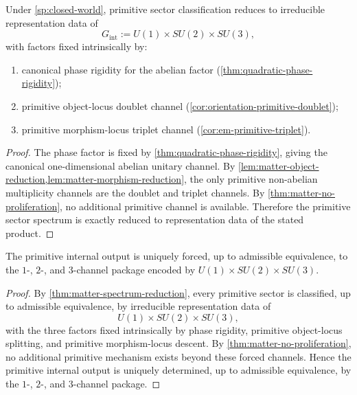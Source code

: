 \begin{theorem}
\label{thm:matter-spectrum-reduction}
Under \cref{sp:closed-world}, primitive sector classification reduces to
irreducible representation data of
\[
  G_{\mathrm{int}} := U(1)\times SU(2)\times SU(3),
\]
with factors fixed intrinsically by:
\begin{enumerate}[label=\textup{(\roman*)}]
\item canonical phase rigidity for the abelian factor
      (\cref{thm:quadratic-phase-rigidity});
\item primitive object-locus doublet channel
      (\cref{cor:orientation-primitive-doublet});
\item primitive morphism-locus triplet channel
      (\cref{cor:em-primitive-triplet}).
\end{enumerate}
\end{theorem}

\begin{proof}
The phase factor is fixed by
\cref{thm:quadratic-phase-rigidity}, giving the canonical
one-dimensional abelian unitary channel.
By
\cref{lem:matter-object-reduction,lem:matter-morphism-reduction}, the
only primitive non-abelian multiplicity channels are the doublet and
triplet channels.
By \cref{thm:matter-no-proliferation}, no additional primitive channel is
available.
Therefore the primitive sector spectrum is exactly reduced to
representation data of the stated product.
\end{proof}

\begin{corollary}
\label{cor:matter-unique-forced-output}
The primitive internal output is uniquely forced, up to admissible
equivalence, to the
\(1\)-, \(2\)-, and \(3\)-channel package encoded by
\(U(1)\times SU(2)\times SU(3)\).
\end{corollary}

\begin{proof}
By \cref{thm:matter-spectrum-reduction}, every primitive sector is
classified, up to admissible equivalence, by irreducible representation
data of
\[
  U(1)\times SU(2)\times SU(3),
\]
with the three factors fixed intrinsically by phase rigidity, primitive
object-locus splitting, and primitive morphism-locus descent.
By \cref{thm:matter-no-proliferation}, no additional primitive mechanism
exists beyond these forced channels.
Hence the primitive internal output is uniquely determined, up to
admissible equivalence, by the \(1\)-, \(2\)-, and \(3\)-channel
package.
\end{proof}

